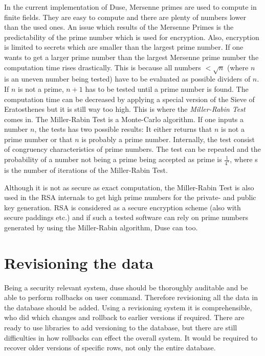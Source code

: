 In the current implementation of Duse, Mersenne primes are used to
compute in finite fields. They are easy to compute and there are
plenty of numbers lower than the used ones. An issue which results
of the Mersenne Primes is the predictability of the prime number
which is used for encryption. Also, encryption is limited to secrets
which are smaller than the largest prime number. If one wants to
get a larger prime number than the largest Mersenne prime number the
computation time rises drastically. This is because all numbers
$< \sqrt{n}$ (where $n$ is an uneven number being tested) have to be evaluated
as possible dividers of $n$. If $n$ is not a prime, $n+1$ has to be
tested until a prime number is found. The computation time can be
decreased by applying a special version of the Sieve of Eratosthenes but
it is still way too high. This is where the \textit{Miller-Rabin Test}
comes in. The Miller-Rabin Test is a Monte-Carlo algorithm. If one inputs
a number $n$, the tests has two possible results: It either returns
that $n$ is not a prime number or that $n$ is probably a prime number.
Internally, the test consist of congruency characteristics of prime numbers.
The test can be repeated and the probability of a number not being a
prime being accepted as prime is $\frac{1}{4^s}$, where s is the number
of iterations of the Miller-Rabin Test.

Although it is not as secure as exact computation, the Miller-Rabin Test
is also used in the RSA internals to get high prime numbers for the
private- and public key generation. RSA is considered as a secure
encryption scheme (also with secure paddings etc.) and if such a tested
software can rely on prime numbers generated by using the Miller-Rabin
algorithm, Duse can too.

\section{Revisioning the data}

Being a security relevant system, duse should be thoroughly auditable and be
able to perform rollbacks on user command. Therefore revisioning all the data
in the database should be added. Using a revisioning system it is
comprehensible, who did which changes and rollback to earlier versions if
required. There are ready to use libraries to add versioning to the database,
but there are still difficulties in how rollbacks can effect the overall
system. It would be required to recover older versions of specific rows, not
only the entire database.

